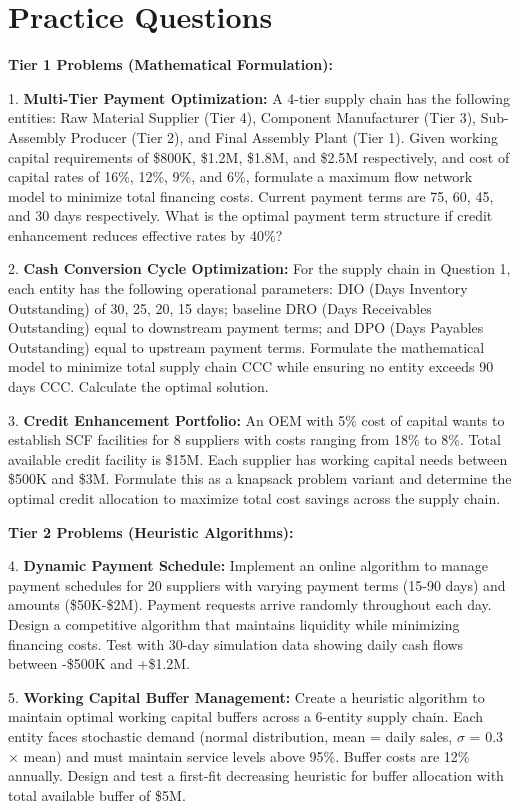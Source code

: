\documentclass{article}
\begin{document}
\section{Practice Questions}

\textbf{Tier 1 Problems (Mathematical Formulation):}

1. \textbf{Multi-Tier Payment Optimization:} A 4-tier supply chain has the following entities: Raw Material Supplier (Tier 4), Component Manufacturer (Tier 3), Sub-Assembly Producer (Tier 2), and Final Assembly Plant (Tier 1). Given working capital requirements of \$800K, \$1.2M, \$1.8M, and \$2.5M respectively, and cost of capital rates of 16\%, 12\%, 9\%, and 6\%, formulate a maximum flow network model to minimize total financing costs. Current payment terms are 75, 60, 45, and 30 days respectively. What is the optimal payment term structure if credit enhancement reduces effective rates by 40\%?

2. \textbf{Cash Conversion Cycle Optimization:} For the supply chain in Question 1, each entity has the following operational parameters: DIO (Days Inventory Outstanding) of 30, 25, 20, 15 days; baseline DRO (Days Receivables Outstanding) equal to downstream payment terms; and DPO (Days Payables Outstanding) equal to upstream payment terms. Formulate the mathematical model to minimize total supply chain CCC while ensuring no entity exceeds 90 days CCC. Calculate the optimal solution.

3. \textbf{Credit Enhancement Portfolio:} An OEM with 5\% cost of capital wants to establish SCF facilities for 8 suppliers with costs ranging from 18\% to 8\%. Total available credit facility is \$15M. Each supplier has working capital needs between \$500K and \$3M. Formulate this as a knapsack problem variant and determine the optimal credit allocation to maximize total cost savings across the supply chain.

\textbf{Tier 2 Problems (Heuristic Algorithms):}

4. \textbf{Dynamic Payment Schedule:} Implement an online algorithm to manage payment schedules for 20 suppliers with varying payment terms (15-90 days) and amounts (\$50K-\$2M). Payment requests arrive randomly throughout each day. Design a competitive algorithm that maintains liquidity while minimizing financing costs. Test with 30-day simulation data showing daily cash flows between -\$500K and +\$1.2M.

5. \textbf{Working Capital Buffer Management:} Create a heuristic algorithm to maintain optimal working capital buffers across a 6-entity supply chain. Each entity faces stochastic demand (normal distribution, mean = daily sales, $\sigma$ = 0.3 × mean) and must maintain service levels above 95\%. Buffer costs are 12\% annually. Design and test a first-fit decreasing heuristic for buffer allocation with total available buffer of \$5M.
\end{document}
